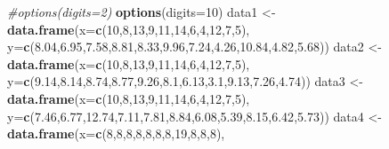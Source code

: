 \documentclass[]{article}
\newenvironment{Shaded}{\begin{snugshade}}{\end{snugshade}}
\newcommand{\KeywordTok}[1]{\textcolor[rgb]{0.13,0.29,0.53}{\textbf{#1}}}
\newcommand{\DataTypeTok}[1]{\textcolor[rgb]{0.13,0.29,0.53}{#1}}
\newcommand{\DecValTok}[1]{\textcolor[rgb]{0.00,0.00,0.81}{#1}}
\newcommand{\FloatTok}[1]{\textcolor[rgb]{0.00,0.00,0.81}{#1}}
\newcommand{\StringTok}[1]{\textcolor[rgb]{0.31,0.60,0.02}{#1}}
\newcommand{\CommentTok}[1]{\textcolor[rgb]{0.56,0.35,0.01}{\textit{#1}}}
\newcommand{\NormalTok}[1]{#1}
\begin{document}
\begin{Shaded}
\begin{Highlighting}[]
\CommentTok{#options(digits=2)}
\KeywordTok{options}\NormalTok{(}\DataTypeTok{digits=}\DecValTok{10}\NormalTok{)}
\NormalTok{data1 <-}\StringTok{ }\KeywordTok{data.frame}\NormalTok{(}\DataTypeTok{x=}\KeywordTok{c}\NormalTok{(}\DecValTok{10}\NormalTok{,}\DecValTok{8}\NormalTok{,}\DecValTok{13}\NormalTok{,}\DecValTok{9}\NormalTok{,}\DecValTok{11}\NormalTok{,}\DecValTok{14}\NormalTok{,}\DecValTok{6}\NormalTok{,}\DecValTok{4}\NormalTok{,}\DecValTok{12}\NormalTok{,}\DecValTok{7}\NormalTok{,}\DecValTok{5}\NormalTok{),}
                    \DataTypeTok{y=}\KeywordTok{c}\NormalTok{(}\FloatTok{8.04}\NormalTok{,}\FloatTok{6.95}\NormalTok{,}\FloatTok{7.58}\NormalTok{,}\FloatTok{8.81}\NormalTok{,}\FloatTok{8.33}\NormalTok{,}\FloatTok{9.96}\NormalTok{,}\FloatTok{7.24}\NormalTok{,}\FloatTok{4.26}\NormalTok{,}\FloatTok{10.84}\NormalTok{,}\FloatTok{4.82}\NormalTok{,}\FloatTok{5.68}\NormalTok{))}
\NormalTok{data2 <-}\StringTok{ }\KeywordTok{data.frame}\NormalTok{(}\DataTypeTok{x=}\KeywordTok{c}\NormalTok{(}\DecValTok{10}\NormalTok{,}\DecValTok{8}\NormalTok{,}\DecValTok{13}\NormalTok{,}\DecValTok{9}\NormalTok{,}\DecValTok{11}\NormalTok{,}\DecValTok{14}\NormalTok{,}\DecValTok{6}\NormalTok{,}\DecValTok{4}\NormalTok{,}\DecValTok{12}\NormalTok{,}\DecValTok{7}\NormalTok{,}\DecValTok{5}\NormalTok{),}
                    \DataTypeTok{y=}\KeywordTok{c}\NormalTok{(}\FloatTok{9.14}\NormalTok{,}\FloatTok{8.14}\NormalTok{,}\FloatTok{8.74}\NormalTok{,}\FloatTok{8.77}\NormalTok{,}\FloatTok{9.26}\NormalTok{,}\FloatTok{8.1}\NormalTok{,}\FloatTok{6.13}\NormalTok{,}\FloatTok{3.1}\NormalTok{,}\FloatTok{9.13}\NormalTok{,}\FloatTok{7.26}\NormalTok{,}\FloatTok{4.74}\NormalTok{))}
\NormalTok{data3 <-}\StringTok{ }\KeywordTok{data.frame}\NormalTok{(}\DataTypeTok{x=}\KeywordTok{c}\NormalTok{(}\DecValTok{10}\NormalTok{,}\DecValTok{8}\NormalTok{,}\DecValTok{13}\NormalTok{,}\DecValTok{9}\NormalTok{,}\DecValTok{11}\NormalTok{,}\DecValTok{14}\NormalTok{,}\DecValTok{6}\NormalTok{,}\DecValTok{4}\NormalTok{,}\DecValTok{12}\NormalTok{,}\DecValTok{7}\NormalTok{,}\DecValTok{5}\NormalTok{),}
                    \DataTypeTok{y=}\KeywordTok{c}\NormalTok{(}\FloatTok{7.46}\NormalTok{,}\FloatTok{6.77}\NormalTok{,}\FloatTok{12.74}\NormalTok{,}\FloatTok{7.11}\NormalTok{,}\FloatTok{7.81}\NormalTok{,}\FloatTok{8.84}\NormalTok{,}\FloatTok{6.08}\NormalTok{,}\FloatTok{5.39}\NormalTok{,}\FloatTok{8.15}\NormalTok{,}\FloatTok{6.42}\NormalTok{,}\FloatTok{5.73}\NormalTok{))}
\NormalTok{data4 <-}\StringTok{ }\KeywordTok{data.frame}\NormalTok{(}\DataTypeTok{x=}\KeywordTok{c}\NormalTok{(}\DecValTok{8}\NormalTok{,}\DecValTok{8}\NormalTok{,}\DecValTok{8}\NormalTok{,}\DecValTok{8}\NormalTok{,}\DecValTok{8}\NormalTok{,}\DecValTok{8}\NormalTok{,}\DecValTok{8}\NormalTok{,}\DecValTok{19}\NormalTok{,}\DecValTok{8}\NormalTok{,}\DecValTok{8}\NormalTok{,}\DecValTok{8}\NormalTok{),}

\end{Highlighting}
\end{Shaded}
\end{document}
